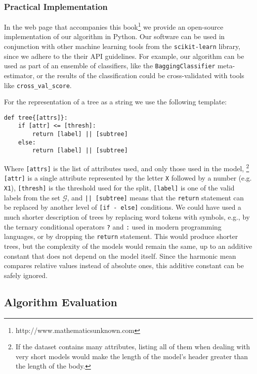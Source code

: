 \subsubsection*{Practical Implementation}

In the web page that accompanies this book\footnote{http://www.mathematicsunknown.com} we provide an open-source implementation of our algorithm in Python. Our software can be used in conjunction with other machine learning tools from the \texttt{scikit-learn} library, since we adhere to the their API guidelines. For example, our algorithm can be used as part of an ensemble of classifiers, like the \texttt{BaggingClassifier} meta-estimator, or the results of the classification could be cross-validated with tools like \texttt{cross\_val\_score}.

For the representation of a tree as a string we use the following template:

\begin{sourcecode}
{\scriptsize \begin{verbatim}
def tree{[attrs]}:
    if [attr] <= [thresh]:
        return [label] || [subtree]
    else:
        return [label] || [subtree]
\end{verbatim}}
\end{sourcecode}

Where \texttt{[attrs]} is the list of attributes used, and only those used in the model,%
\footnote{If the dataset contains many attributes, listing all of them when dealing with very short models would make the length of the model's header greater than the length of the body.}  \texttt{[attr]} is a single attribute represented by the letter \texttt{X} followed by a number (e.g. \texttt{X1}), \texttt{[thresh]} is the threshold used for the split, \texttt{[label]} is one of the valid labels from the set $\mathcal{G}$, and \texttt{|| [subtree]} means that the \texttt{return} statement can be replaced by another level of \texttt{[if - else]} conditions. We could have used a much shorter description of trees by replacing word tokens with symbols, e.g., by the ternary conditional operators \texttt{?} and \texttt{:} used in modern programming languages, or by dropping the \texttt{return} statement. This would produce shorter trees, but the complexity of the models would remain the same, up to an additive constant that does not depend on the model itself. Since the harmonic mean compares relative values instead of absolute ones, this additive constant can be safely ignored.

\subsection{Algorithm Evaluation}
\label{sub:algorithm_evaluation}

